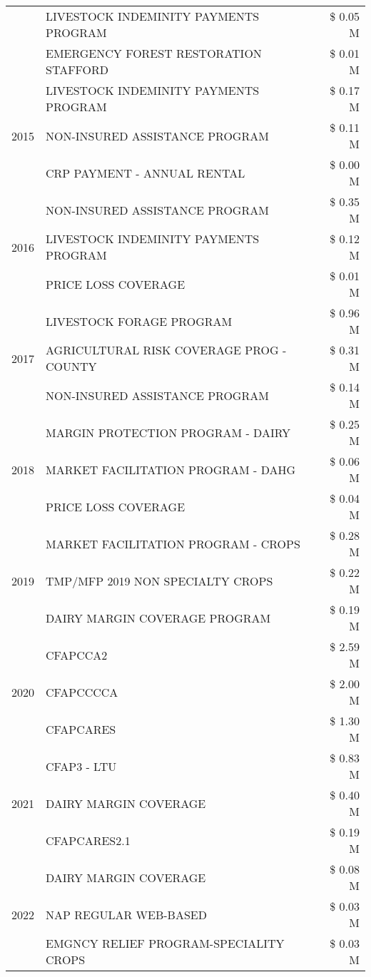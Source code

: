 \begin{tabular}{llr}
 & LIVESTOCK INDEMINITY PAYMENTS PROGRAM & \$ 0.05 M \\
 & EMERGENCY FOREST RESTORATION STAFFORD & \$ 0.01 M \\
\cline{1-3}
\multirow[t]{3}{*}{2015} & LIVESTOCK INDEMINITY PAYMENTS PROGRAM & \$ 0.17 M \\
 & NON-INSURED ASSISTANCE PROGRAM & \$ 0.11 M \\
 & CRP PAYMENT - ANNUAL RENTAL & \$ 0.00 M \\
\cline{1-3}
\multirow[t]{3}{*}{2016} & NON-INSURED ASSISTANCE PROGRAM & \$ 0.35 M \\
 & LIVESTOCK INDEMINITY PAYMENTS PROGRAM & \$ 0.12 M \\
 & PRICE LOSS COVERAGE & \$ 0.01 M \\
\cline{1-3}
\multirow[t]{3}{*}{2017} & LIVESTOCK FORAGE PROGRAM & \$ 0.96 M \\
 & AGRICULTURAL RISK COVERAGE PROG - COUNTY & \$ 0.31 M \\
 & NON-INSURED ASSISTANCE PROGRAM & \$ 0.14 M \\
\cline{1-3}
\multirow[t]{3}{*}{2018} & MARGIN PROTECTION PROGRAM - DAIRY & \$ 0.25 M \\
 & MARKET FACILITATION PROGRAM - DAHG & \$ 0.06 M \\
 & PRICE LOSS COVERAGE & \$ 0.04 M \\
\cline{1-3}
\multirow[t]{3}{*}{2019} & MARKET FACILITATION PROGRAM - CROPS & \$ 0.28 M \\
 & TMP/MFP 2019 NON SPECIALTY CROPS & \$ 0.22 M \\
 & DAIRY MARGIN COVERAGE PROGRAM & \$ 0.19 M \\
\cline{1-3}
\multirow[t]{3}{*}{2020} & CFAPCCA2 & \$ 2.59 M \\
 & CFAPCCCCA & \$ 2.00 M \\
 & CFAPCARES & \$ 1.30 M \\
\cline{1-3}
\multirow[t]{3}{*}{2021} & CFAP3 - LTU & \$ 0.83 M \\
 & DAIRY MARGIN COVERAGE & \$ 0.40 M \\
 & CFAPCARES2.1 & \$ 0.19 M \\
\cline{1-3}
\multirow[t]{3}{*}{2022} & DAIRY MARGIN COVERAGE & \$ 0.08 M \\
 & NAP REGULAR WEB-BASED & \$ 0.03 M \\
 & EMGNCY RELIEF PROGRAM-SPECIALITY CROPS & \$ 0.03 M \\
\cline{1-3}
\bottomrule
\end{tabular}
